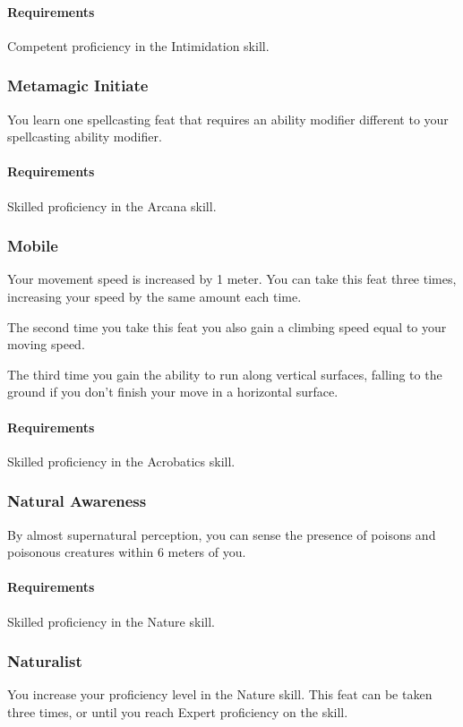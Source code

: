     \paragraph{Requirements} Competent proficiency in the Intimidation skill.
\subsubsection{Metamagic Initiate} \label{feat::metamagicinitiate}
    You learn one spellcasting feat that requires an ability modifier different to your spellcasting ability modifier.
    \paragraph{Requirements} Skilled proficiency in the Arcana skill.
\subsubsection{Mobile} \label{feat::mobile}
    Your movement speed is increased by 1 meter.
    You can take this feat three times, increasing your speed by the same amount each time.

    The second time you take this feat you also gain a climbing speed equal to your moving speed.

    The third time you gain the ability to run along vertical surfaces, falling to the ground if you don't finish your move in a horizontal surface.
    \paragraph{Requirements} Skilled proficiency in the Acrobatics skill.
\subsubsection{Natural Awareness} \label{feat::naturalawareness}
    By almost supernatural perception, you can sense the presence of poisons and poisonous creatures within 6 meters of you.

    \paragraph{Requirements} Skilled proficiency in the Nature skill.
\subsubsection{Naturalist} \label{feat::naturalist}
    You increase your proficiency level in the Nature skill.
    This feat can be taken three times, or until you reach Expert proficiency on the skill.
